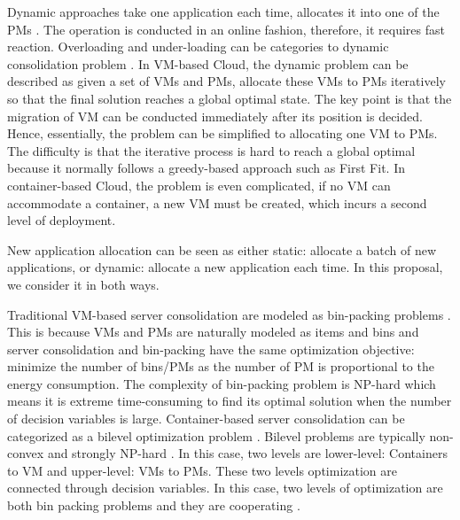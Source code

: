 Dynamic approaches take one application each time, allocates it into one of the PMs \cite{Xiao:2015ik}. The operation is conducted in an online fashion, therefore, it requires fast reaction. Overloading and under-loading can be categories to dynamic consolidation problem \cite{Beloglazov:2013ht}.  
In VM-based Cloud, the dynamic problem can be described as given a set of VMs and PMs, allocate these VMs to PMs iteratively so that the final solution reaches a global optimal state.
The key point is that the migration of VM can be conducted immediately after its position is decided. Hence, essentially, the problem can be simplified to allocating one VM to PMs. The difficulty is that the iterative process is hard to reach a global optimal because it normally follows a greedy-based approach such as First Fit. In container-based Cloud,  the problem is even complicated, if no VM can accommodate a container, a new VM must be created, which incurs a second level of deployment.

New application allocation can be seen as either static: allocate a batch of new applications, or dynamic: allocate a new application each time. In this proposal, we consider it in both ways.

Traditional VM-based server consolidation are modeled as bin-packing problems \cite{Mann:2015ua}. This is because VMs and PMs are naturally modeled as items and bins and server consolidation and bin-packing have the same optimization objective: minimize the number of bins/PMs as the number of PM is proportional to the energy consumption. The complexity of bin-packing problem is NP-hard which means it is extreme time-consuming to find its optimal solution when the number of decision variables is large. Container-based server consolidation can be categorized as a bilevel optimization problem \cite{Colson:2007bu}. Bilevel problems are typically non-convex and strongly NP-hard \cite{Vicente:1994ie}. In this case, two levels are lower-level: Containers to VM and upper-level: VMs to PMs. These two levels optimization are connected through decision variables. In this case, two levels of optimization are both bin packing problems and they are cooperating \cite{Legillon:2012dd}.

